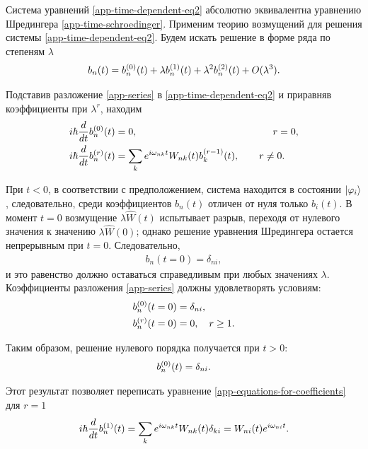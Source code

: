 \begin{subappendices}
Система уравнений \eqref{app-time-dependent-eq2} абсолютно эквивалентна уравнению Шредингера \eqref{app-time-schroedinger}. Применим теорию возмущений для решения системы \eqref{app-time-dependent-eq2}. Будем искать решение в форме ряда по степеням $\lambda$
\begin{gather}
    b_n(t) = b_n^{(0)}(t) + \lambda b_n^{(1)}(t) + \lambda^2 b_n^{(2)}(t) + O(\lambda^3). \label{app-series}
\end{gather}

Подставив разложение \eqref{app-series} в \eqref{app-time-dependent-eq2} и приравняв коэффициенты при $\lambda^r$, находим
\begin{gather}
    \begin{aligned}
        i \hbar \frac{d}{dt} \bnp{0}(t) &= 0, \hspace{4.82cm} r = 0,  \\
        i \hbar \frac{d}{dt} \bnp{r}(t) &= \sum_k e^{i \omega_{nk} t} W_{nk}(t) b_k^{(r-1)}(t), \qquad r \neq 0.
    \end{aligned} \label{app-equations-for-coefficients}
\end{gather}

При $t < 0$, в соответствии с предположением, система находится в состоянии $\ket{\varphi_i}$, следовательно, среди коэффициентов 
$b_n(t)$ отличен от нуля только $b_i(t)$. В момент $t = 0$ возмущение $\lambda \hat{W}(t)$ испытывает разрыв, переходя от нулевого значения к значению $\lambda \hat{W}(0)$; однако решение уравнения Шредингера остается непрерывным при $t = 0$. Следовательно, 
\begin{gather}
    b_n(t = 0) = \delta_{ni},
\end{gather}
и это равенство должно оставаться справедливым при любых значениях $\lambda$. Коэффициенты разложения \eqref{app-series} должны удовлетворять условиям:
\begin{gather}
    \begin{aligned}
        b_n^{(0)}(t = 0) &= \delta_{ni}, \\
        b_n^{(r)}(t = 0) &= 0, \quad r \geq 1.
    \end{aligned}  \label{app-initial-conditions-for-coefficients}
\end{gather}

Таким образом, решение нулевого порядка получается при $t > 0$:
\begin{gather}
    b_n^{(0)}(t) = \delta_{ni}.
\end{gather}

Этот результат позволяет переписать уравнение \eqref{app-equations-for-coefficients} для $r = 1$
\begin{gather}
    i \hbar \frac{d}{dt} b_n^{(1)}(t) = \sum_k e^{i \omega_{nk} t} W_{nk}(t) \delta_{ki} = W_{ni}(t) e^{i \omega_{ni} t}.
\end{gather}


\end{subappendices}
